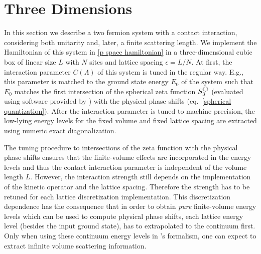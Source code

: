 \section{Three Dimensions}\label{sec:3D}

In this section we describe a two fermion system with a contact interaction, considering both unitarity and, later, a finite scattering length.
We implement the Hamiltonian of this system in \eqref{p space hamiltonian} in a three-dimensional cubic box of linear size $L$ with $N$ sites and lattice spacing $\epsilon=L/N$.
At first, the interaction parameter $C(\Lambda)$ of this system is tuned in the regular way. 
E.g., this parameter is matched to the ground state energy $E_0$ of the system such that $E_0$ matches the first intersection of the spherical zeta function $S^{\bigcirc}_3$ (evaluated using software provided by ) with the physical phase shifts (eq.~\eqref{spherical quantization}).
After the interaction parameter is tuned to machine precision, the low-lying energy levels for the fixed volume and fixed lattice spacing are extracted using numeric exact diagonalization.

The tuning procedure to intersections of the zeta function with the physical phase shifts ensures that the finite-volume effects are incorporated in the energy levels and thus the contact interaction parameter is independent of the volume length $L$.
However, the interaction strength still depends on the implementation of the kinetic operator and the lattice spacing.
Therefore the strength has to be retuned for each lattice discretization implementation.
This discretization dependence has the consequence that in order to obtain \textit{pure} finite-volume energy levels which can be used to compute physical phase shifts, each lattice energy level (besides the input ground state), has to extrapolated to the continuum first.
Only when using these continuum energy levels in \Luscher's formalism, one can expect to extract infinite volume scattering information.

